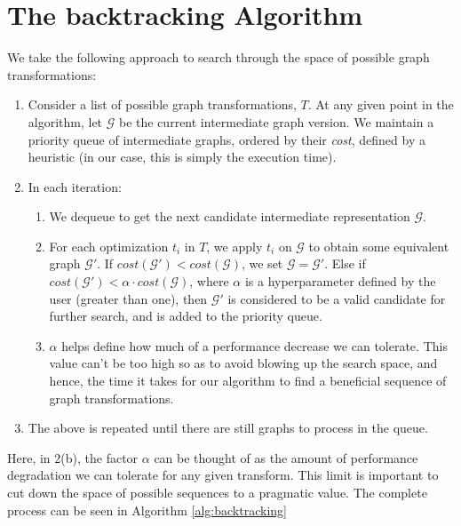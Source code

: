 \documentclass[12pt,a4paper,twoside,openright,bibliography=totocnumbered]{report}
\begin{document}
\section{The backtracking Algorithm} \label{backtracking}
We take the following approach to search through the space of possible graph transformations:
		\begin{enumerate}
			\item Consider a list of possible graph transformations, $T$. At any given point in the algorithm, let $\mathcal{G}$ be the current intermediate graph version. We maintain a priority queue of intermediate graphs, ordered by their \textit{cost}, defined by a heuristic (in our case, this is simply the execution time).
			\item In each iteration:
				\begin{enumerate}
					\item We dequeue to get the next candidate intermediate representation $\mathcal{G}$. 
					\item For each optimization $t_i$ in $T$, we apply $t_i$ on $\mathcal{G}$ to obtain some equivalent graph $\mathcal{G}'$. If $cost(\mathcal{G}') < cost(\mathcal{G})$, we set $\mathcal{G} = \mathcal{G}'$. Else if $cost(\mathcal{G}') < \alpha \cdot cost(\mathcal{G})$, where $\alpha$ is a hyperparameter defined by the user (greater than one), then $\mathcal{G}'$ is considered to be a valid candidate for further search, and is added to the priority queue.
					\item $\alpha$ helps define how much of a performance decrease we can tolerate. This value can't be too high so as to avoid blowing up the search space, and hence, the time it takes for our algorithm to find a beneficial sequence of graph transformations.
				\end{enumerate}

			\item The above is repeated until there are still graphs to process in the queue.
		\end{enumerate}

Here, in 2(b), the factor $\alpha$ can be thought of as the amount of performance degradation we can tolerate for any given transform. This limit is important to cut down the space of possible sequences to a pragmatic value. The complete process can be seen in Algorithm \ref{alg:backtracking}
\end{document}
